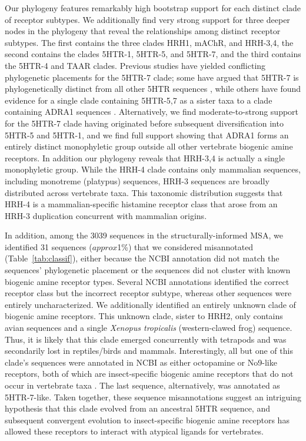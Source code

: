 \documentclass[fleqn,10pt]{wlpeerj}
\begin{document}
Our phylogeny features remarkably high bootstrap support for each distinct clade of receptor subtypes. We additionally find very strong support for three deeper nodes in the phylogeny that reveal the relationships among distinct receptor subtypes. The first contains the three clades HRH1, mAChR, and HRH-3,4, the second contains the clades 5HTR-1, 5HTR-5, and 5HTR-7, and the third contains the 5HTR-4 and TAAR clades. Previous studies have yielded conflicting phylogenetic placements for the 5HTR-7 clade; some have argued that 5HTR-7 is phylogenetically distinct from all other 5HTR sequences \citep{KakaralaJamil2014}, while others have found evidence for a single clade containing 5HTR-5,7 as a sister taxa to a clade containing ADRA1 sequences \citep{Fredrikssonetal2003}. Alternatively, we find moderate-to-strong support for the 5HTR-7 clade having originated before subsequent diversification into 5HTR-5 and 5HTR-1, and we find full support showing that ADRA1 forms an entirely distinct monophyletic group outside all other vertebrate biogenic amine receptors. In addition our phylogeny reveals that HRH-3,4 is actually a single monophyletic group. While the HRH-4 clade contains only mammalian sequences, including monotreme (platypus) sequences, HRH-3 sequences are broadly distributed across vertebrate taxa. This taxonomic distribution suggests that HRH-4 is a mammalian-specific histamine receptor class that arose from an HRH-3 duplication concurrent with mammalian origins.

In addition, among the 3039 sequences in the structurally-informed MSA, we identified 31 sequences ($approx$1\%) that we considered misannotated (Table~\ref{tab:classif}), either because the NCBI annotation did not match the sequences' phylogenetic placement or the sequences did not cluster with known biogenic amine receptor types. Several NCBI annotations identified the correct receptor class but the incorrect receptor subtype, whereas other sequences were entirely uncharacterized. We additionally identified an entirely unknown clade of biogenic amine receptors. This unknown clade, sister to HRH2, only contains avian sequences and a single \emph{Xenopus tropicalis} (western-clawed frog) sequence. Thus, it is likely that this clade emerged concurrently with tetrapods and was secondarily lost in reptiles/birds and mammals. Interestingly, all but one of this clade's sequences were annotated in NCBI as either octopamine or No9-like receptors, both of which are insect-specific biogenic amine receptors that do not occur in vertebrate taxa \citep{Roeder2005}. The last sequence, alternatively, was annotated as 5HTR-7-like. Taken together, these sequence misannotations suggest an intriguing hypothesis that this clade evolved from an ancestral 5HTR sequence, and subsequent convergent evolution to insect-specific biogenic amine receptors has allowed these receptors to interact with atypical ligands for vertebrates.
\end{document}
